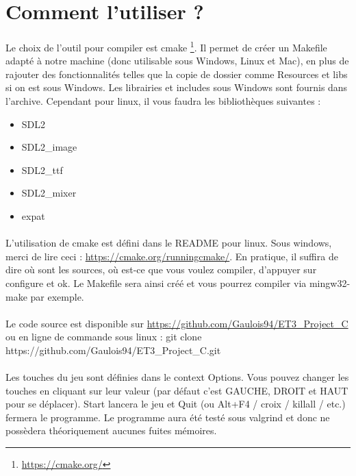 ﻿\section{Comment l'utiliser ?}

\paragraph{} Le choix de l'outil pour compiler est cmake \footnote{\url{https://cmake.org/}}. Il permet de créer un Makefile adapté à notre machine (donc utilisable sous Windows, Linux et Mac), en plus de rajouter des fonctionnalités telles que la copie de dossier comme Resources et libs si on est sous Windows. Les librairies et includes sous Windows sont fournis dans l'archive. Cependant pour linux, il vous faudra les bibliothèques suivantes :

\begin{itemize}
	\item SDL2
	\item SDL2\_image
	\item SDL2\_ttf
	\item SDL2\_mixer
	\item expat
\end{itemize}

\paragraph{} L'utilisation de cmake est défini dans le README pour linux. Sous windows, merci de lire ceci : \url{https://cmake.org/runningcmake/}. En pratique, il suffira de dire où sont les sources, où est-ce que vous voulez compiler, d'appuyer sur configure et ok. Le Makefile sera ainsi créé et vous pourrez compiler via mingw32-make par exemple.
\paragraph{} Le code source est disponible sur \url{https://github.com/Gaulois94/ET3\_Project\_C} ou en ligne de commande sous linux : git clone https://github.com/Gaulois94/ET3\_Project\_C.git
\paragraph{} Les touches du jeu sont définies dans le context Options. Vous pouvez changer les touches en cliquant sur leur valeur (par défaut c'est GAUCHE, DROIT et HAUT pour se déplacer). Start lancera le jeu et Quit (ou Alt+F4 / croix / killall / etc.) fermera le programme. Le programme aura été testé sous valgrind et donc ne possèdera théoriquement aucunes fuites mémoires.
